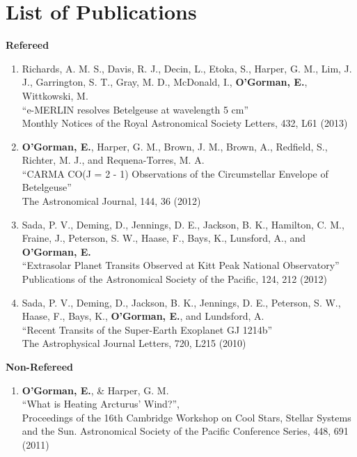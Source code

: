\chapter{List of Publications}
\label{chapter:publications}


{\large \textbf{Refereed}}

\begin{enumerate}

\item Richards, A. M. S., Davis, R. J., Decin, L., Etoka, S., Harper, G. M., Lim, J. J., Garrington, S. T., Gray, M. D., McDonald, I., \textbf{O'Gorman, E.}, Wittkowski, M.\\
``e-MERLIN resolves Betelgeuse at wavelength 5 cm''\\
Monthly Notices of the Royal Astronomical Society Letters, 432, L61 (2013)

\item \textbf{O'Gorman, E.}, Harper, G. M., Brown, J. M., Brown, A., Redfield, S., Richter, M. J., and Requena-Torres, M. A.\\
``CARMA CO(J = 2 - 1) Observations of the Circumstellar Envelope of Betelgeuse''\\
The Astronomical Journal, 144, 36 (2012)

\item Sada, P. V., Deming, D., Jennings, D. E., Jackson, B. K., Hamilton, C. M., Fraine, J., Peterson, S. W., Haase, F., Bays, K., Lunsford, A., and \textbf{O'Gorman, E.}\\
``Extrasolar Planet Transits Observed at Kitt Peak National Observatory''\\
Publications of the Astronomical Society of the Pacific, 124, 212 (2012)

\item Sada, P. V., Deming, D., Jackson, B. K., Jennings, D. E., Peterson, S. W., Haase, F., Bays, K., \textbf{O'Gorman, E.}, and Lundsford, A.\\
``Recent Transits of the Super-Earth Exoplanet GJ 1214b''\\
The Astrophysical Journal Letters, 720, L215 (2010)
\end{enumerate}


\begin{flushleft}
{\large \textbf{Non-Refereed}}
\end{flushleft}

\begin{enumerate}
\item \textbf{O'Gorman, E.}, \& Harper, G. M.\\
``What is Heating Arcturus' Wind?'', \\
Proceedings of the 16th Cambridge Workshop on Cool Stars, Stellar Systems and the Sun. 
Astronomical Society of the Pacific Conference Series, 448, 691 (2011)
\end{enumerate}

